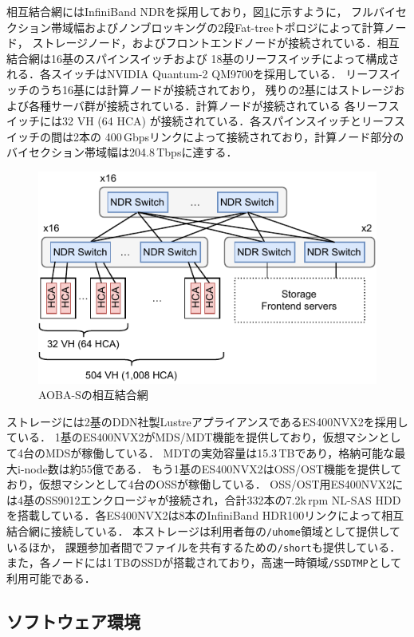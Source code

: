 ﻿\documentclass[submit,techrep,noauthor]{ipsj}
\begin{document}
相互結合網にはInfiniBand NDRを採用しており，図\ref{fig:topo}に示すように，
フルバイセクション帯域幅およびノンブロッキングの2段Fat-treeトポロジによって計算ノード，
ストレージノード，およびフロントエンドノードが接続されている．相互結合網は16基のスパインスイッチおよび
18基のリーフスイッチによって構成される．各スイッチはNVIDIA Quantum-2 QM9700を採用している．
リーフスイッチのうち16基には計算ノードが接続されており，
残りの2基にはストレージおよび各種サーバ群が接続されている．計算ノードが接続されている
各リーフスイッチには32 VH (64 HCA) が接続されている．各スパインスイッチとリーフスイッチの間は2本の
400\,Gbpsリンクによって接続されており，計算ノード部分のバイセクション帯域幅は204.8\,Tbpsに達する．

\begin{figure}[tb]
  \centering
  \includegraphics{figs/nw_topology.pdf}
  \caption{AOBA-Sの相互結合網}\label{fig:topo}
\end{figure}

ストレージには2基のDDN社製LustreアプライアンスであるES400NVX2を採用している．
1基のES400NVX2がMDS/MDT機能を提供しており，仮想マシンとして4台のMDSが稼働している．
MDTの実効容量は15.3\,TBであり，格納可能な最大i-node数は約55億である．
もう1基のES400NVX2はOSS/OST機能を提供しており，仮想マシンとして4台のOSSが稼働している．
OSS/OST用ES400NVX2には4基のSS9012エンクロージャが接続され，合計332本の7.2k\,rpm NL-SAS
HDDを搭載している．各ES400NVX2は8本のInfiniBand HDR100リンクによって相互結合網に接続している．
本ストレージは利用者毎の\verb|/uhome|領域として提供しているほか，
課題参加者間でファイルを共有するための\verb|/short|も提供している．
また，各ノードには1\,TBのSSDが搭載されており，高速一時領域\verb|/SSDTMP|として利用可能である．

\subsection{ソフトウェア環境}
\end{document}
